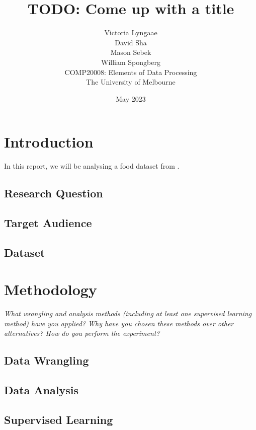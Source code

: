 \documentclass[11pt]{article}
\title{TODO: Come up with a title}
\author{
    Victoria Lyngaae\\
\AND
    David Sha\\
\AND
    Mason Sebek\\
\AND
    William Spongberg\\
\AND
\AND
\AND
	COMP20008: Elements of Data Processing\\
\AND
	The University of Melbourne\\
}
\date{May 2023}
\begin{document}
\maketitle

\newpage
\tableofcontents
\thispagestyle{empty}

\newpage
\setcounter{page}{1}
\section{Introduction}

In this report, we will be analysing a food dataset from \cite{FoodStandardsAustraliaNewZealand}.

\subsection{Research Question}

\subsection{Target Audience}

\subsection{Dataset}

\section{Methodology}

\emph{What wrangling and analysis methods (including at least one supervised learning method) have you applied? Why have you chosen these methods over other alternatives? How do you perform the experiment?}

\subsection{Data Wrangling}

\subsection{Data Analysis}

\subsection{Supervised Learning}
\end{document}
